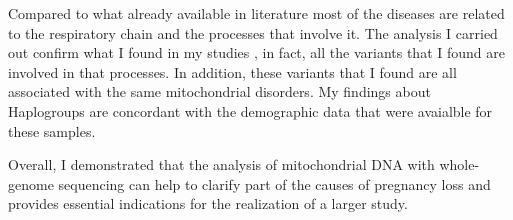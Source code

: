 
Compared to what already available in literature most of the
diseases are related to the respiratory chain and the processes that
involve it. The analysis I carried out confirm what I found in my
studies , in fact, all the variants that I found are involved in
that processes. 
In addition, these variants that I found are all associated with the same mitochondrial disorders.
My findings about Haplogroups are concordant with the demographic data that were avaialble for these samples.  






Overall, I demonstrated that the analysis of mitochondrial DNA with whole-genome sequencing  can help to clarify part of the causes of pregnancy loss and provides essential indications for the realization of a larger study.


